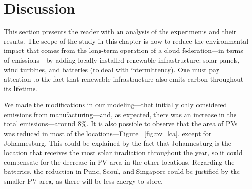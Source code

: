




 




\section{Discussion}
\label{sec:long_term_discussion}

This section presents the reader with an analysis of the experiments and their results. The scope of the study in this chapter is how to reduce the environmental impact that comes from the long-term operation of a cloud federation---in terms of  emissions---by adding locally installed renewable infrastructure: solar panels, wind turbines, and batteries (to deal with intermittency). One must pay attention to the fact that renewable infrastructure also emits carbon throughout its lifetime. 

We made the modifications in our modeling---that initially only considered emissions from manufacturing---and, as expected, there was an increase in the total emissions---around 8\%. It is also possible to observe that the area of PVs was reduced in most of the locations---Figure ~\ref{fig:pv_lca}, except for Johannesburg. This could be explained by the fact that Johannesburg is the location that receives the most solar irradiation throughout the year, so it could compensate for the decrease in PV area in the other locations. Regarding the batteries, the reduction in Pune, Seoul, and Singapore could be justified by the smaller PV area, as there will be less energy to store.

